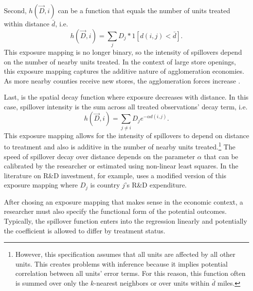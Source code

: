 \documentclass[11pt]{article}
\begin{document}
\begin{example}
    Second, $h(\vec{D}, i)$ can be a function that equals the number of units treated within distance $\bar{d}$, i.e. \begin{equation}\label{eq:h_within_additive}
        h(\vec{D}, i) = \sum_{j} D_j * 1[ d(i,j) < \bar{d} ].
    \end{equation}
    This exposure mapping is no longer binary, so the intensity of spillovers depend on the number of nearby units treated. In the context of large store openings, this exposure mapping captures the additive nature of agglomeration economies. As more nearby counties receive new stores, the agglomeration forces increase \citep{Basker_2005}.
\end{example}
    
\begin{example}
    Last, is the spatial decay function where exposure decreases with distance. In this case, spillover intensity is the sum across all treated observations' decay term, i.e. \begin{equation}\label{eq:h_decay}
        h(\vec{D}, i) = \sum_{j \neq i} D_j e^{-\alpha d(i,j)}.
    \end{equation} 
    This exposure mapping allows for the intensity of spillovers to depend on distance to treatment and also is additive in the number of nearby units treated.\footnote{However, this specification assumes that all units are affected by all other units. This creates problems with inference because it implies potential correlation between all units' error terms. For this reason, this function often is summed over only the $k$-nearest neighbors or over units within $\bar{d}$ miles.} The speed of spillover decay over distance depends on the parameter $\alpha$ that can be calibrated by the researcher or estimated using non-linear least squares. In the literature on R\&D investment, for example, \citet{Keller_2002} uses a modified version of this exposure mapping where $D_j$ is country $j$'s R\&D expenditure. 
\end{example}

After chosing an exposure mapping that makes sense in the economic context, a researcher must also specify the functional form of the potential outcomes. Typically, the spillover function enters into the regression linearly and potentially the coefficient is allowed to differ by treatment status. 



\end{document}
